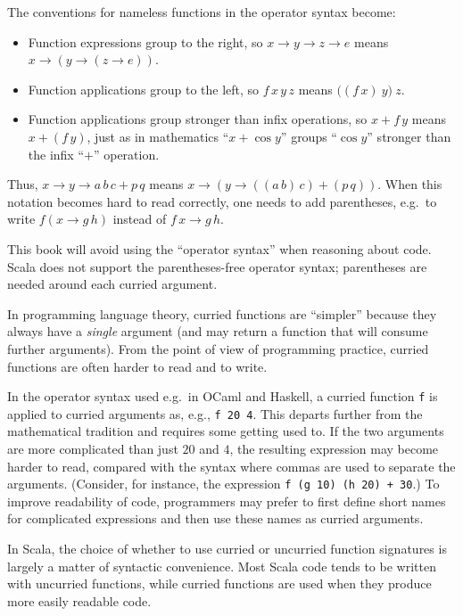 The conventions for nameless functions in the operator syntax become:
\begin{itemize}
\item Function expressions group to the right, so $x\rightarrow y\rightarrow z\rightarrow e$
means $x\rightarrow\left(y\rightarrow\left(z\rightarrow e\right)\right)$.
\item Function applications group to the left, so $f\,x\,y\,z$ means $\big((f\,x)\:y\big)\:z$.
\item Function applications group stronger than infix operations, so $x+f\,y$
means $x+(f\,y)$, just as in mathematics ``$x+\cos y$'' groups
``$\cos y$'' stronger than the infix ``$+$'' operation.
\end{itemize}
Thus, $x\rightarrow y\rightarrow a\,b\,c+p\,q$ means $x\rightarrow\left(y\rightarrow\left(\left(a\,b\right)\,c\right)+(p\,q)\right)$.
When this notation becomes hard to read correctly, one needs to add
parentheses, e.g.\ to write $f(x\rightarrow g\,h)$ instead of $f\,x\rightarrow g\,h$.

This book will avoid using the ``operator syntax'' when reasoning
about code. Scala does not support the parentheses-free operator syntax;
parentheses are needed around each curried argument.

In programming language theory, curried functions are ``simpler''
because they always have a \emph{single} argument (and may return
a function that will consume further arguments). From the point of
view of programming practice, curried functions are often harder to
read and to write.

In the operator syntax used e.g.\ in OCaml and Haskell, a curried
function \lstinline!f! is applied to curried arguments as, e.g.,
\lstinline!f 20 4!. This departs further from the mathematical tradition
and requires some getting used to. If the two arguments are more complicated
than just $20$ and $4$, the resulting expression may become harder
to read, compared with the syntax where commas are used to separate
the arguments. (Consider, for instance, the expression \lstinline!f (g 10) (h 20) + 30!.)
To improve readability of code, programmers may prefer to first define
short names for complicated expressions and then use these names as
curried arguments.

In Scala, the choice of whether to use curried or uncurried function
signatures is largely a matter of syntactic convenience. Most Scala
code tends to be written with uncurried functions, while curried functions
are used when they produce more easily readable code.

